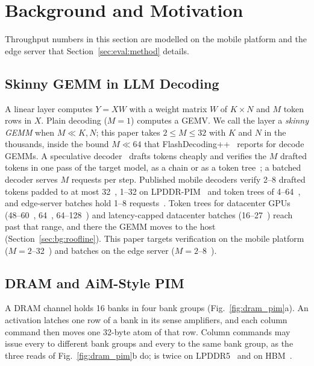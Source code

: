 \section{Background and Motivation}
\label{sec:bg}

Throughput numbers in this section are modelled on the mobile platform and the edge server that
Section~\ref{sec:eval:method} details.

\subsection{Skinny GEMM in LLM Decoding}
\label{sec:bg:skinny}

A linear layer computes $Y = X W$ with a weight matrix $W$ of $K \times N$ and $M$ token rows in $X$. Plain decoding
($M = 1$) computes a GEMV. We call the layer a \emph{skinny GEMM} when $M \ll K, N$; this paper takes $2 \le M \le 32$
with $K$ and $N$ in the thousands, inside the bound $M \ll 64$ that FlashDecoding++~\cite{flashdecodingpp} reports for
decode GEMMs. A speculative decoder~\cite{leviathan2023} drafts tokens cheaply and verifies the $M$ drafted tokens in one
pass of the target model, as a chain or as a token tree~\cite{eagle2}; a batched decoder serves $M$ requests per step.
Published mobile decoders verify 2--8 drafted tokens padded to at most 32~\cite{sdnpu}, 1--32 on LPDDR-PIM~\cite{lpspec}
and token trees of 4--64~\cite{lever}, and edge-server batches hold 1--8 requests~\cite{p3llm}. Token trees for
datacenter GPUs (48--60~\cite{eagle2}, 64~\cite{medusa}, 64--128~\cite{sequoia}) and latency-capped datacenter batches
(16--27~\cite{attacc}) reach past that range, and there the GEMM moves to the host (Section~\ref{sec:bg:roofline}). This
paper targets verification on the mobile platform ($M = 2$--32~\cite{sdnpu,lpspec}) and batches on the edge server
($M = 2$--8~\cite{p3llm}).

\subsection{DRAM and AiM-Style PIM}
\label{sec:bg:pim}

A DRAM channel holds 16 banks in four bank groups (Fig.~\ref{fig:dram_pim}a). An activation latches one row of a bank in
its sense amplifiers, and each column command then moves one 32-byte atom of that row. Column commands may issue every
\tccds{} to different bank groups and every \tccdl{} to the same bank group, as the three reads of
Fig.~\ref{fig:dram_pim}b do; \tccdl{} is twice \tccds{} on
LPDDR5~\cite{ramulator2} and on HBM~\cite{p3llm}.

